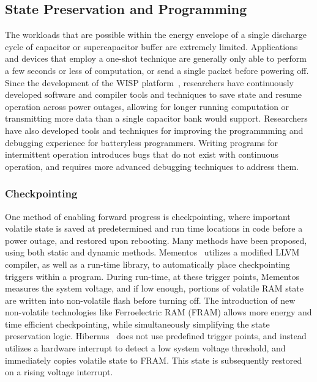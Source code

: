 \subsection{State Preservation and Programming}
The workloads that are possible within the energy envelope of a single discharge cycle of capacitor or supercapacitor buffer are extremely limited.
Applications and devices that employ a one-shot technique are generally only able to perform a few seconds or less of computation, or send a single packet before powering off.
Since the development of the WISP platform~\cite{sample2008design}, researchers have continuously developed software and compiler tools and techniques to save state and resume operation across power outages, allowing for longer running computation or transmitting more data than a single capacitor bank would support.
Researchers have also developed tools and techniques for improving the programmming and debugging experience for batteryless programmers. Writing programs for intermittent operation introduces bugs that do not exist with continuous operation, and requires more advanced debugging techniques to address them.

\subsubsection{Checkpointing}
One method of enabling forward progress is checkpointing,
where important volatile state is saved at predetermined and run time locations in code before a power outage, and restored upon rebooting. Many methods have been proposed, using both static and dynamic methods.
Mementos~\cite{ransford2012mementos} utilizes a modified LLVM compiler, as well as a run-time library, to automatically place checkpointing triggers within a program. During run-time, at these trigger points, Mementos measures the system voltage, and if low enough, portions of volatile RAM state are written into non-volatile flash before turning off.
The introduction of new non-volatile technologies like Ferroelectric RAM (FRAM) allows more energy and time efficient checkpointing, while simultaneously simplifying the state preservation logic.
Hibernus~\cite{balsamo2014hibernus} does not use predefined trigger points, and instead utilizes a hardware interrupt to detect a low system voltage threshold, and immediately copies volatile state to FRAM. This state is subsequently restored on a rising voltage interrupt.

